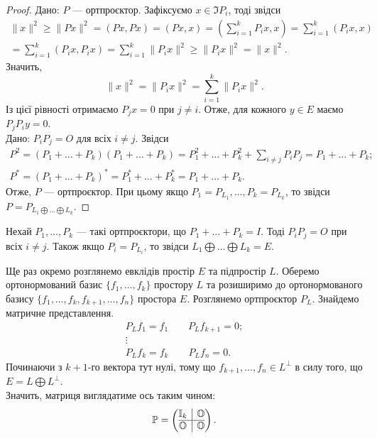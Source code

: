 \documentclass{math_library}
\begin{document}
\begin{proof}
\rightproof Дано: $P$ --- ортпроєктор. Зафіксуємо $x \in \Im P_i$, тоді звідси
\begin{align*}
\|x\|^2 \geq \|Px\|^2 = (Px,Px) = (Px,x) = \displaystyle\left( \sum_{i=1}^k P_i x, x \right) = \sum_{i=1}^k (P_i x, x) \\ = \sum_{i=1}^k (P_i x, P_i x) = \sum_{i=1}^k \|P_i x\|^2 \geq \| P_i x \|^2 = \|x\|^2.
\end{align*}
Значить, 
\[
\|x\|^2 = \|P_i x\|^2 = \displaystyle\sum_{i=1}^k \|P_i x\|^2.
\]
Із цієї рівності отримаємо $P_j x = 0$ при $j \neq i$. Отже, для кожного $y \in E$ маємо $P_j P_i y = 0$.
\bigskip \\
\leftproof Дано: $P_i P_j = O$ для всіх $i \neq j$. Звідси
\begin{align*}
P^2 = (P_1 + \dots + P_k)(P_1 + \dots + P_k) = P_1^2 + \dots + P_k^2 + \sum_{i \neq j} P_i P_j = P_1 + \dots + P_k; \\
P^* = (P_1 + \dots + P_k)^* = P_1^* + \dots + P_k^* = P_1 + \dots + P_k.
\end{align*}
Отже, $P$ --- ортпроєктор. При цьому якщо $P_1 = P_{L_1},\dots, P_k = P_{L_k}$, то звідси $P = P_{L_1 \bigoplus \dots \bigoplus L_k}$.
\end{proof}

\begin{corollary}
Нехай $P_1,\dots,P_k$ --- такі ортпроєктори, що $P_1 + \dots + P_k = I$. Тоді $P_i P_j = O$ при всіх $i \neq j$. Також якщо $P_i = P_{L_i}$, то звідси $L_1 \bigoplus \dots \bigoplus L_k = E$.
\end{corollary}
\noindent
Ще раз окремо розглянемо евклідів простір $E$ та підпростір $L$. Оберемо ортонормований базис $\{f_1,\dots,f_k\}$ простору $L$ та розиширимо до ортонормованого базису $\{f_1,\dots,f_k,f_{k+1},\dots,f_n\}$ простора $E$.  Розглянемо ортпроєктор $P_L$. Знайдемо матричне представлення.
\begin{align*}
P_L f_1 = f_1 \qquad P_L f_{k+1} = 0;\\
\vdots \\
P_L f_k = f_k \qquad P_L f_n = 0.
\end{align*}
Починаючи з $k+1$-го вектора тут нулі, тому що $f_{k+1},\dots,f_n \in L^\perp$ в силу того, що $E = L \bigoplus L^\perp$.\\
Значить, матриця виглядатиме ось таким чином:
\[
\mathbb{P} = \left(\begin{array}{@{}c|c@{}}
\mathbb{I}_k & \mathbb{O} \\
\hline
\mathbb{O} & \mathbb{O}
\end{array}\right).
\]
\end{document}
